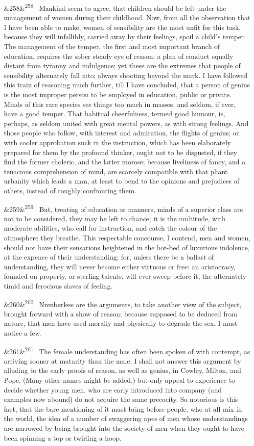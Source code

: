\documentclass[12pt]{article}
\newcommand{\para}[1][]{\par\noindent\ifx&#1&\else\textsuperscript{\footnotesize #1}~\fi}
\begin{document}
\para[258] Mankind seem to agree, that children should be left under the management of women during their childhood. Now, from all the observation that I have been able to make, women of sensibility are the most unfit for this task, because they will infallibly, carried away by their feelings, spoil a child's temper. The management of the temper, the first and most important branch of education, requires the sober steady eye of reason; a plan of conduct equally distant from tyranny and indulgence; yet these are the extremes that people of sensibility alternately fall into; always shooting beyond the mark. I have followed this train of reasoning much further, till I have concluded, that a person of genius is the most improper person to be employed in education, public or private. Minds of this rare species see things too much in masses, and seldom, if ever, have a good temper. That habitual cheerfulness, termed good humour, is, perhaps, as seldom united with great mental powers, as with strong feelings. And those people who follow, with interest and admiration, the flights of genius; or, with cooler approbation suck in the instruction, which has been elaborately prepared for them by the profound thinker, ought not to be disgusted, if they find the former choleric, and the latter morose; because liveliness of fancy, and a tenacious comprehension of mind, are scarcely compatible with that pliant urbanity which leads a man, at least to bend to the opinions and prejudices of others, instead of roughly confronting them.

\para[259] But, treating of education or manners, minds of a superior class are not to be considered, they may be left to chance; it is the multitude, with moderate abilities, who call for instruction, and catch the colour of the atmosphere they breathe. This respectable concourse, I contend, men and women, should not have their sensations heightened in the hot-bed of luxurious indolence, at the expence of their understanding; for, unless there be a ballast of understanding, they will never become either virtuous or free: an aristocracy, founded on property, or sterling talents, will ever sweep before it, the alternately timid and ferocious slaves of feeling.

\para[260] Numberless are the arguments, to take another view of the subject, brought forward with a show of reason; because supposed to be deduced from nature, that men have used morally and physically to degrade the sex. I must notice a few.

\para[261] The female understanding has often been spoken of with contempt, as arriving sooner at maturity than the male. I shall not answer this argument by alluding to the early proofs of reason, as well as genius, in Cowley, Milton, and Pope, (Many other names might be added.) but only appeal to experience to decide whether young men, who are early introduced into company (and examples now abound) do not acquire the same precocity. So notorious is this fact, that the bare mentioning of it must bring before people, who at all mix in the world, the idea of a number of swaggering apes of men whose understandings are narrowed by being brought into the society of men when they ought to have been spinning a top or twirling a hoop.
\end{document}
